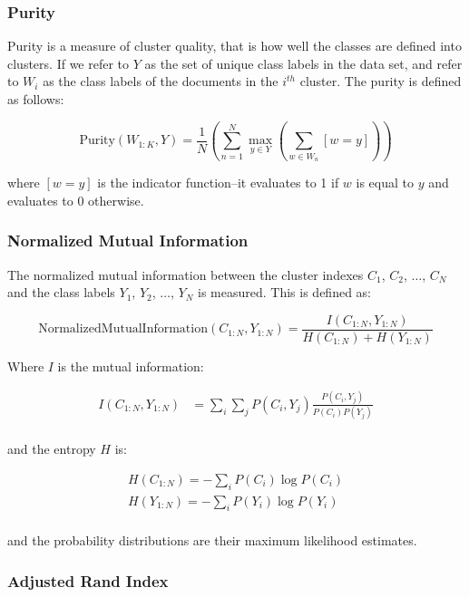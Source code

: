 \documentclass[11pt]{article}
\begin{document}
\subsubsection{Purity}

Purity is a measure of cluster quality, that is how well the classes are defined into clusters. If we refer to $Y$ as the set of unique class labels in the data set, and refer to $W_i$ as the class labels of the documents in the $i^{th}$ cluster. The purity is defined as follows:

\begin{equation}
{\text{Purity}}(W_{1:K}, Y) = \frac{1}{N} \left ( \sum_{n=1}^N \max_{y \in Y} \left (\sum_{w \in W_n} [w = y] \right ) \right )
\end{equation} 

where $[w=y]$ is the indicator function--it evaluates to 1 if $w$ is equal to $y$ and evaluates to 0 otherwise. 

\subsubsection{Normalized Mutual Information}

The normalized mutual information between the cluster indexes $C_1$, $C_2$, $\dots$, $C_N$ and the class labels  $Y_1$, $Y_2$, $\dots$, $Y_N$ is measured. This is defined as:

\begin{equation}
\text{NormalizedMutualInformation}(C_{1:N}, Y_{1:N}) = \frac{I(C_{1:N}, Y_{1:N}) }{H(C_{1:N}) + H(Y_{1:N}) }
\end{equation}

Where $I$ is the mutual information:

\begin{align}
I(C_{1:N}, Y_{1:N}) &= \sum_i \sum_j {P(C_i, Y_j)} \frac{P(C_i, Y_j)}{P(C_i)P(Y_j)} \\
\end{align}

and the entropy $H$ is:

\begin{align}
H(C_{1:N}) = - \sum_i P(C_i) \log P(C_i) \\
H(Y_{1:N}) = - \sum_i P(Y_i) \log P(Y_i) \\
\end{align}

and the probability distributions are their maximum likelihood estimates. 

\subsubsection{Adjusted Rand Index}
\end{document}
